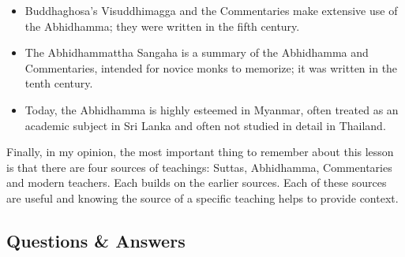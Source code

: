 \begin{itemize}
\begin{itemize}
\end{itemize}

\item Buddhaghosa’s Visuddhimagga and the Commentaries make extensive use of the Abhidhamma; they were written in the fifth century.

\item The Abhidhammattha Sangaha is a summary of the Abhidhamma and Commentaries, intended for novice monks to memorize; it was written in the tenth century.

\item Today, the Abhidhamma is highly esteemed in Myanmar, often treated as an academic subject in Sri Lanka and often not studied in detail in Thailand.

\end{itemize}

Finally, in my opinion, the most important thing to remember about this lesson is that there are four sources of teachings: Suttas, Abhidhamma, Commentaries and modern teachers. Each builds on the earlier sources. Each of these sources are useful and knowing the source of a specific teaching helps to provide context.

\newpage

\subsection*{Questions \& Answers}



